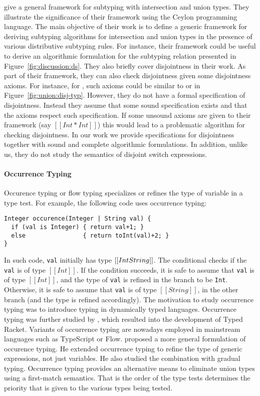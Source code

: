 \citet{muehlboeck2018empowering} give a general framework for subtyping
with intersection and union types. They illustrate the significance of
their framework using the Ceylon programming language.
The main objective of their work is to define a generic framework for
deriving subtyping algorithms for
intersection and union types in the presence of various distributive subtyping rules.
For instance, their framework could be useful to derive an algorithmic
formulation for the subtyping relation presented in Figure~\ref{fig:discussion:ds}.
They also briefly cover disjointness in their work. As part of their framework, they
can also check disjointness given some disjointness axioms. For instance,
for \name, such axioms could be similar to  or 
in Figure~\ref{fig:union:disj-typ}.
However, they do not have a formal
specification of disjointness. Instead they assume that some sound specification
exists and that the axioms respect such specification.
If some unsound axioms are given to their framework (say $[[Int * Int]]$) this
would lead to a problematic algorithm for checking disjointness.
In our work we provide specifications for disjointness together
with sound and complete algorithmic formulations.
In addition, unlike us,
they do not study the semantics of disjoint switch expressions.

\paragraph{Occurrence Typing}
Occurence typing or flow typing \cite{tobin2008design} specializes or refines
the type of variable in a type test. For example, the following code
uses occurrence typing:

\begin{lstlisting}
Integer occurence(Integer | String val) {
  if (val is Integer) { return val+1; }
  else                { return toInt(val)+2; }
}
\end{lstlisting}

\noindent In such code, \lstinline{val} initially has type $[[Int \/ String]]$.
The conditional checks if the \lstinline{val} is of type $[[Int]]$.
If the condition succeeds, it is safe to assume that \lstinline{val} is of type $[[Int]]$,
and the type of \lstinline{val} is refined in the branch to be \lstinline{Int}.
Otherwise, it is safe to assume that \lstinline{val} is of type $[[String]]$, in the
other branch (and the type is refined accordingly).
The motivation to study occurrence typing was to introduce typing in dynamically
typed languages.
Occurrence typing was further studied by \cite{tobin2010logical},
which resulted into the development of Typed Racket.
Variants of occurrence typing are nowadays employed in mainstream languages
such as TypeScript or Flow.
\cite{castagna2019revisiting} proposed a more general formulation of
occurence typing. He extended occurrence typing to refine the type of
generic expressions, not just variables. He also studied the combination
with gradual typing. Occurrence typing provides an alternative
means to eliminate union types using a first-match semantics. That is the
order of the type tests determines the priority that is given to the various
types being tested.

